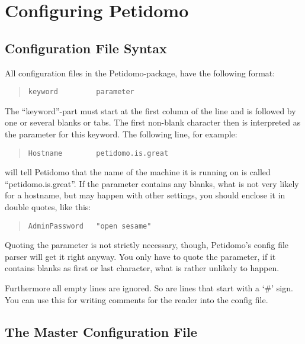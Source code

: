 \documentclass[a4paper,10pt]{scrreprt}
\begin{document}
\chapter{Configuring Petidomo}

\section{Configuration File Syntax}

All configuration files in the Petidomo-package\label{Config file
format}, have the following format:
\begin{quote}
\begin{verbatim}
keyword         parameter
\end{verbatim}
\end{quote}

The ``keyword''-part must start at the first column of the line and is
followed by one or several blanks or tabs. The first non-blank
character then is interpreted as the parameter for this keyword. The
following line, for example:
\begin{quote}
\begin{verbatim}
Hostname        petidomo.is.great
\end{verbatim}
\end{quote}
will tell Petidomo that the name of the machine it is running on is
called ``petidomo.is.great''. If the parameter contains any blanks,
what is not very likely for a hostname, but may happen with other
settings, you should enclose it in double quotes, like this:
\begin{quote}
\begin{verbatim}
AdminPassword   "open sesame"
\end{verbatim}
\end{quote}

Quoting the parameter is not strictly necessary, though, Petidomo's
config file parser will get it right anyway. You only have to quote
the parameter, if it contains blanks as first or last character, what
is rather unlikely to happen.

Furthermore all empty lines are ignored. So are lines that start with
a `\#' sign. You can use this for writing comments for the reader into
the config file.

\section{The Master Configuration File}
\label{master config file}
\end{document}
